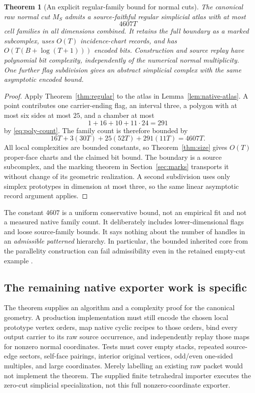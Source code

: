 \documentclass[11pt]{article}
\newtheorem{theorem}{Theorem}[section]
\theoremstyle{definition}\newtheorem{definition}[theorem]{Definition}
\theoremstyle{remark}\newtheorem{remark}[theorem]{Remark}
\newcommand{\code}[1]{\texttt{\detokenize{#1}}}
\begin{document}
\begin{theorem}[An explicit regular-family bound for normal cuts]\label{thm:4607}
The canonical raw normal cut \(M_S\) admits a source-faithful regular simplicial atlas with at most
\begin{equation}\label{eq:4607}
                              4607T
\end{equation}
cell families in all dimensions combined. It retains the full boundary as a marked subcomplex, uses \(O(T)\) incidence-chart records, and has \(O(T(B+\log(T+1)))\) encoded bits. Construction and source replay have polynomial bit complexity, independently of the numerical normal multiplicity. One further flag subdivision gives an abstract simplicial complex with the same asymptotic encoded bound.
\end{theorem}
\begin{proof}
Apply Theorem~\ref{thm:regular} to the atlas in Lemma~\ref{lem:native-atlas}. A point contributes one carrier-ending flag, an interval three, a polygon with at most six sides at most \(25\), and a chamber at most
\[
                         1+16+10+11\cdot24=291
\]
by \eqref{eq:poly-count}. The family count is therefore bounded by
\[
            16T+3(30T)+25(52T)+291(11T)=4607T.
\]
All local complexities are bounded constants, so Theorem~\ref{thm:size} gives \(O(T)\) proper-face charts and the claimed bit bound. The boundary is a source subcomplex, and the marking theorem in Section~\ref{sec:marks} transports it without change of its geometric realization. A second subdivision uses only simplex prototypes in dimension at most three, so the same linear asymptotic record argument applies.
\end{proof}

The constant \(4607\) is a uniform conservative bound, not an empirical fit and not a measured native family count. It deliberately includes lower-dimensional flags and loose source-family bounds. It says nothing about the number of handles in an \emph{admissible patterned} hierarchy. In particular, the bounded inherited core from the parallelity construction can fail admissibility even in the retained empty-cut example \cite{parallelity,fixture}.

\subsection{The remaining native exporter work is specific}
The theorem supplies an algorithm and a complexity proof for the canonical geometry. A production implementation must still encode the chosen local prototype vertex orders, map native cyclic recipes to those orders, bind every output carrier to its raw source occurrence, and independently replay those maps for nonzero normal coordinates. Tests must cover empty stacks, repeated source-edge sectors, self-face pairings, interior original vertices, odd/even one-sided multiples, and large coordinates. Merely labelling an existing raw packet \code{regular: true} would not implement the theorem. The supplied finite tetrahedral importer executes the zero-cut simplicial specialization, not this full nonzero-coordinate exporter.
\end{document}
